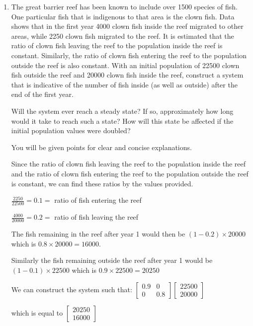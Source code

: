 \documentclass[answers, a4paper, 11pt]{exam}
\begin{document}
\begin{enumerate}
\item The great barrier reef has been known to include over 1500 species of fish. One particular fish that is indigenous to that area is the clown fish. Data shows that in the first year 4000 clown fish inside the reef migrated to other areas, while 2250 clown fish migrated to the reef. It is estimated that the ratio of clown fish leaving the reef to the population inside the reef is constant. Similarly, the ratio of clown fish entering the reef to the population outside the reef is also constant. With an initial population of 22500 clown fish outside the reef and 20000 clown fish inside the reef, construct a system that is indicative of the number of fish inside (as well as outside) after the end of the first year. 

Will the system ever reach a steady state? If so, approximately how long would it take to reach such a state? How will this state be affected if the initial population values were doubled? 

You will be given points for clear and concise explanations.

\begin{solution}
    Since the ratio of clown fish leaving the reef to the population inside the reef and the ratio of clown fish entering the reef to the population outside the reef is constant, we can find these ratios by the values provided. 
    
    $\frac{2250}{22500} =  0.1 =$ ratio of fish entering the reef 
    
    $\frac{4000}{20000} = 0.2 =$ ratio of fish leaving the reef 
    
    The fish remaining in the reef after year 1 would then be $(1 - 0.2) \times 20000$ which is $0.8 \times 20000 = 16000$.
    
    Similarly the fish remaining outside the reef after year 1 would be $(1 - 0.1) \times 22500$ which is $0.9 \times 22500 = 20250$
    
    We can construct the system such that:
    $
    \begin{bmatrix} 0.9 & 0 \\ 0 & 0.8 \end{bmatrix}{}
    \begin{bmatrix} 22500 \\ 20000 \end{bmatrix}
    $
    
    which is equal to 
    $
    \begin{bmatrix}
    20250 \\ 16000
    \end{bmatrix}
    $
  

\end{solution}
\end{enumerate}
\end{document}
